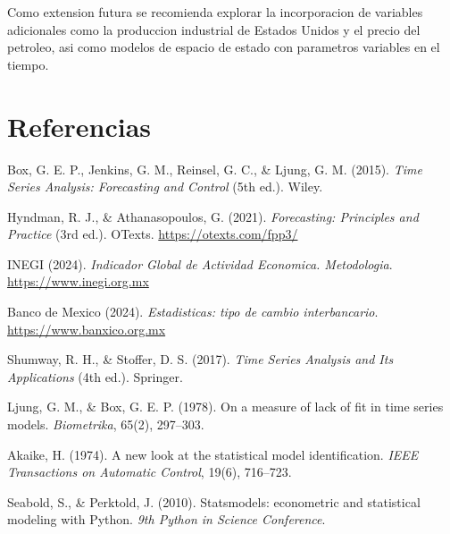 \documentclass[12pt,a4paper]{article}
\begin{document}
Como extension futura se recomienda explorar la incorporacion de variables adicionales como la produccion industrial de Estados Unidos y el precio del petroleo, asi como modelos de espacio de estado con parametros variables en el tiempo.

\newpage
\section*{Referencias}

\begin{enumerate}[label={[\arabic*]}]
  \item Box, G. E. P., Jenkins, G. M., Reinsel, G. C., \& Ljung, G. M. (2015). \textit{Time Series Analysis: Forecasting and Control} (5th ed.). Wiley.
  \item Hyndman, R. J., \& Athanasopoulos, G. (2021). \textit{Forecasting: Principles and Practice} (3rd ed.). OTexts. \url{https://otexts.com/fpp3/}
  \item INEGI (2024). \textit{Indicador Global de Actividad Economica. Metodologia}. \url{https://www.inegi.org.mx}
  \item Banco de Mexico (2024). \textit{Estadisticas: tipo de cambio interbancario}. \url{https://www.banxico.org.mx}
  \item Shumway, R. H., \& Stoffer, D. S. (2017). \textit{Time Series Analysis and Its Applications} (4th ed.). Springer.
  \item Ljung, G. M., \& Box, G. E. P. (1978). On a measure of lack of fit in time series models. \textit{Biometrika}, 65(2), 297--303.
  \item Akaike, H. (1974). A new look at the statistical model identification. \textit{IEEE Transactions on Automatic Control}, 19(6), 716--723.
  \item Seabold, S., \& Perktold, J. (2010). Statsmodels: econometric and statistical modeling with Python. \textit{9th Python in Science Conference}.
\end{enumerate}
\end{document}
